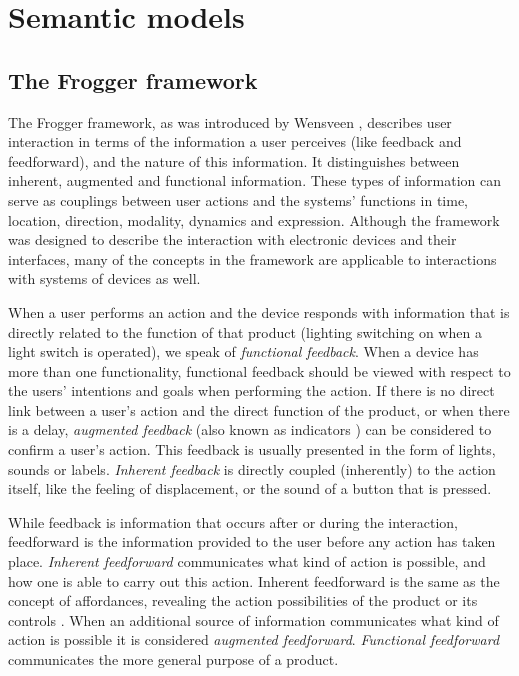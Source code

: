 \section{Semantic models}
\label{SemanticModels}
\subsection{The Frogger framework}
\label{interactionFrogger}
The Frogger framework, as was introduced by Wensveen \cite{Wensveen2005}, describes user interaction in terms of the information a user perceives (like feedback and feedforward), and the nature of this information. It distinguishes between inherent, augmented and functional information. These types of information can serve as couplings between user actions and the systems' functions in time, location, direction, modality, dynamics and expression. Although the framework was designed to describe the interaction with electronic devices and their interfaces, many of the concepts in the framework are applicable to interactions with systems of devices as well.

When a user performs an action and the device responds with information that is directly related to the function of that product (lighting switching on when a light switch is operated), we speak of \emph{functional feedback}. When a device has more than one functionality, functional feedback should be viewed with respect to the users' intentions and goals when performing the action. If there is no direct link between a user's action and the direct function of the product, or when there is a delay, \emph{augmented feedback} (also known as indicators \cite{Thimbleby2007}) can be considered to confirm a user's action. This feedback is usually presented in the form of lights, sounds or labels. \emph{Inherent feedback} is directly coupled (inherently) to the action itself, like the feeling of displacement, or the sound of a button that is pressed.

While feedback is information that occurs after or during the interaction, feedforward is the information provided to the user before any action has taken place. \emph{Inherent feedforward} communicates what kind of action is possible, and how one is able to carry out this action. Inherent feedforward is the same as the concept of affordances, revealing the action possibilities of the product or its controls \cite{Wensveen2005}. When an additional source of information communicates what kind of action is possible it is considered \emph{augmented feedforward}.  
\emph{Functional feedforward} communicates the more general purpose of a product. %

